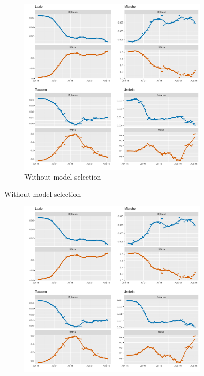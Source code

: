 \documentclass[12pt]{article}
\begin{document}
\begin{appendices}
		\begin{figure}[H]
    	    \centering
    	    \begin{subfigure}{\textwidth}
    	      \centering
    	      \includegraphics[width=\linewidth]{output/model_between_lag14_betas_Centro (IT)_rolling.pdf}
    	      \caption{Without model selection}
    	      \label{fig:beta_between_over_time_centro_regular}
    	    \end{subfigure}
        \end{figure}
        \begin{figure}[H]\ContinuedFloat
    	    \begin{subfigure}{\textwidth}
    	      \centering
    	      \includegraphics[width=\linewidth]{output/model_between_lag14_betas_Centro (IT)_aic_rolling.pdf}

\end{subfigure}
\end{figure}
\end{appendices}
\end{document}
